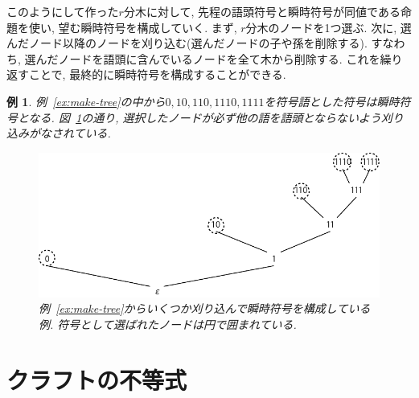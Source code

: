 \documentclass[12pt]{ltjsarticle}
\newcommand*{\exref}[1]{例~\ref{#1}}
\newcommand*{\fgref}[1]{図~\ref{#1}}
\newtheorem{example}{例}
\begin{document}
このようにして作った$r$分木に対して, 先程の語頭符号と瞬時符号が同値である命題を使い,
望む瞬時符号を構成していく.
まず, $r$分木のノードを1つ選ぶ.
次に, 選んだノード以降のノードを刈り込む(選んだノードの子や孫を削除する).
すなわち, 選んだノードを語頭に含んでいるノードを全て木から削除する.
これを繰り返すことで, 最終的に瞬時符号を構成することができる.
\begin{example}
  \exref{ex:make-tree}の中から$0, 10, 110, 1110, 1111$を符号語とした符号は瞬時符号となる.
  \fgref{fg:processed-binary-tree}の通り,
  選択したノードが必ず他の語を語頭とならないよう刈り込みがなされている.
  \begin{figure}
    \centering
    \includegraphics{image/構成された瞬時符号.pdf}
    \caption{\exref{ex:make-tree}からいくつか刈り込んで瞬時符号を構成している例. 符号として選ばれたノードは円で囲まれている.}
    \label{fg:processed-binary-tree}
  \end{figure}
\end{example}

\section{クラフトの不等式}

\printbibliography[title=参考文献]
\end{document}
